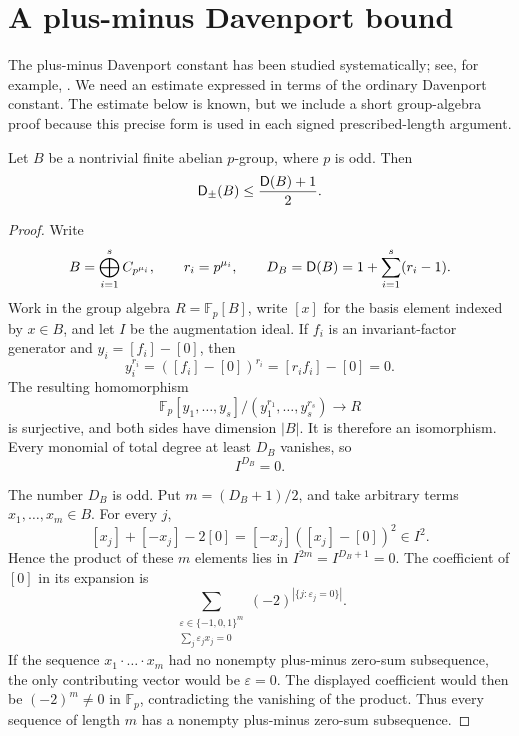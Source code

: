 \section{A plus-minus Davenport bound}\label{sec:plus-minus}

The plus-minus Davenport constant has been studied systematically; see,
for example, \cite{MarchanOrdazSchmid2014}. We need an estimate expressed
in terms of the ordinary Davenport constant. The estimate below is
known, but we include a short group-algebra proof because this precise
form is used in each signed prescribed-length argument.

\begin{proposition}\label{prop:plus-minus-bound}
Let \(B\) be a nontrivial finite abelian \(p\)-group, where \(p\) is
odd. Then
\[
  \mathsf D_{\pm}(B)\le \frac{\mathsf D(B)+1}{2}.
\]
\end{proposition}

\begin{proof}
Write
\[
  B=\bigoplus_{i=1}^s C_{p^{\mu_i}},
  \qquad r_i=p^{\mu_i},
  \qquad D_B=\mathsf D(B)=1+\sum_{i=1}^s(r_i-1).
\]
Work in the group algebra \(R=\mathbb F_p[B]\), write \([x]\) for the
basis element indexed by \(x\in B\), and let \(I\) be the augmentation
ideal. If \(f_i\) is an invariant-factor generator and
\(y_i=[f_i]-[0]\), then
\[
  y_i^{r_i}=([f_i]-[0])^{r_i}=[r_if_i]-[0]=0.
\]
The resulting homomorphism
\[
  \mathbb F_p[y_1,\ldots,y_s]/(y_1^{r_1},\ldots,y_s^{r_s})
  \longrightarrow R
\]
is surjective, and both sides have dimension \(|B|\). It is therefore
an isomorphism. Every monomial of total degree at least \(D_B\)
vanishes, so
\begin{equation}\label{eq:augmentation-nilpotence}
  I^{D_B}=0.
\end{equation}

The number \(D_B\) is odd. Put \(m=(D_B+1)/2\), and take arbitrary
terms \(x_1,\ldots,x_m\in B\). For every \(j\),
\[
  [x_j]+[-x_j]-2[0]
  =[-x_j]([x_j]-[0])^2\in I^2.
\]
Hence the product of these \(m\) elements lies in
\(I^{2m}=I^{D_B+1}=0\). The coefficient of \([0]\) in its expansion is
\[
  \sum_{\substack{\varepsilon\in\{-1,0,1\}^m\\
                   \sum_j\varepsilon_jx_j=0}}
       (-2)^{|\{j:\varepsilon_j=0\}|}.
\]
If the sequence \(x_1\cdot\ldots\cdot x_m\) had no nonempty
plus-minus zero-sum subsequence, the only contributing vector would be
\(\varepsilon=0\). The displayed coefficient would then be
\((-2)^m\ne0\) in \(\mathbb F_p\), contradicting the vanishing of the
product. Thus every sequence of length \(m\) has a nonempty plus-minus
zero-sum subsequence.
\end{proof}
